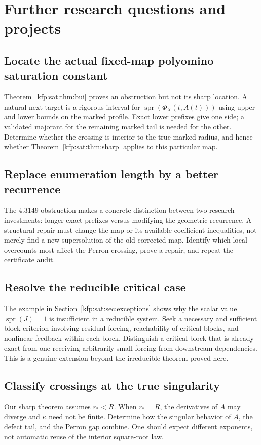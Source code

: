 \documentclass[11pt,a4paper]{article}
\theoremstyle{definition}
\theoremstyle{remark}
\newcommand{\spr}{\operatorname{spr}}
\begin{document}
\section{Further research questions and projects}
\label{kfp:sat:sec:future}

\subsection{Locate the actual fixed-map polyomino saturation constant}
Theorem~\ref{kfp:sat:thm:bui} proves an obstruction but not its sharp location.
A natural next target is a rigorous interval for
$\spr(\Phi_X(t,A(t)))$ using upper and lower bounds on the marked
profile. Exact lower prefixes give one side; a validated majorant for the
remaining marked tail is needed for the other. Determine whether the
crossing is interior to the true marked radius, and hence whether
Theorem~\ref{kfp:sat:thm:sharp} applies to this particular map.

\subsection{Replace enumeration length by a better recurrence}
The $4.3149$ obstruction makes a concrete distinction between two research
investments: longer exact prefixes versus modifying the geometric
recurrence. A structural repair must change the map or its available
coefficient inequalities, not merely find a new supersolution of the old
corrected map. Identify which local overcounts most affect the Perron
crossing, prove a repair, and repeat the certificate audit.

\subsection{Resolve the reducible critical case}
The example in Section~\ref{kfp:sat:sec:exceptions} shows why the scalar value
$\spr(J)=1$ is insufficient in a reducible system. Seek a necessary and
sufficient block criterion involving residual forcing, reachability of
critical blocks, and nonlinear feedback within each block. Distinguish a
critical block that is already exact from one receiving arbitrarily small
forcing from downstream dependencies. This is a genuine extension beyond
the irreducible theorem proved here.

\subsection{Classify crossings at the true singularity}
Our sharp theorem assumes $r_*<R$. When $r_*=R$, the derivatives of $A$
may diverge and $\kappa$ need not be finite. Determine how the singular
behavior of $A$, the defect tail, and the Perron gap combine. One should
expect different exponents, not automatic reuse of the interior
square-root law.
\end{document}
